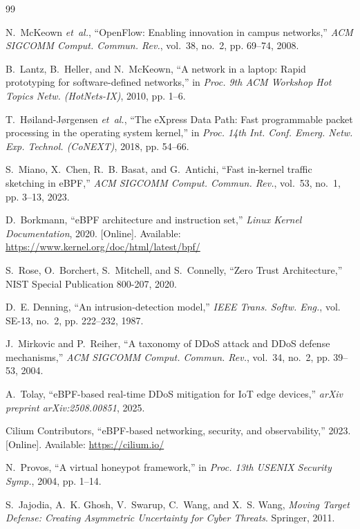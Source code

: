 \documentclass[conference]{IEEEtran}
\begin{document}
\begin{thebibliography}{99}

N.~McKeown \emph{et~al.}, ``OpenFlow: Enabling innovation in campus networks,'' \emph{ACM SIGCOMM Comput. Commun. Rev.}, vol.~38, no.~2, pp. 69--74, 2008.

B.~Lantz, B.~Heller, and N.~McKeown, ``A network in a laptop: Rapid prototyping for software-defined networks,'' in \emph{Proc. 9th ACM Workshop Hot Topics Netw. (HotNets-IX)}, 2010, pp. 1--6.

T.~H{\o}iland-J{\o}rgensen \emph{et~al.}, ``The eXpress Data Path: Fast programmable packet processing in the operating system kernel,'' in \emph{Proc. 14th Int. Conf. Emerg. Netw. Exp. Technol. (CoNEXT)}, 2018, pp. 54--66.

S.~Miano, X.~Chen, R.~B. Basat, and G.~Antichi, ``Fast in-kernel traffic sketching in eBPF,'' \emph{ACM SIGCOMM Comput. Commun. Rev.}, vol.~53, no.~1, pp. 3--13, 2023.

D.~Borkmann, ``eBPF architecture and instruction set,'' \emph{Linux Kernel Documentation}, 2020. [Online]. Available: \url{https://www.kernel.org/doc/html/latest/bpf/}

S.~Rose, O.~Borchert, S.~Mitchell, and S.~Connelly, ``Zero Trust Architecture,'' NIST Special Publication 800-207, 2020.

D.~E. Denning, ``An intrusion-detection model,'' \emph{IEEE Trans. Softw. Eng.}, vol. SE-13, no.~2, pp. 222--232, 1987.

J.~Mirkovic and P.~Reiher, ``A taxonomy of DDoS attack and DDoS defense mechanisms,'' \emph{ACM SIGCOMM Comput. Commun. Rev.}, vol.~34, no.~2, pp. 39--53, 2004.

A.~Tolay, ``eBPF-based real-time DDoS mitigation for IoT edge devices,'' \emph{arXiv preprint arXiv:2508.00851}, 2025.

Cilium Contributors, ``eBPF-based networking, security, and observability,'' 2023. [Online]. Available: \url{https://cilium.io/}

N.~Provos, ``A virtual honeypot framework,'' in \emph{Proc. 13th USENIX Security Symp.}, 2004, pp. 1--14.

S.~Jajodia, A.~K. Ghosh, V.~Swarup, C.~Wang, and X.~S. Wang, \emph{Moving Target Defense: Creating Asymmetric Uncertainty for Cyber Threats}. Springer, 2011.


\end{thebibliography}
\end{document}
